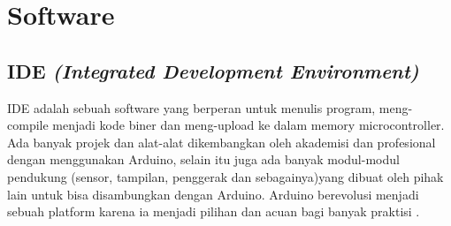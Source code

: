 \section{Software}
\subsection{IDE \textit{(Integrated Development Environment)}}
IDE adalah sebuah software yang berperan untuk menulis program, meng-compile menjadi kode biner dan meng-upload ke dalam memory microcontroller. Ada banyak projek dan alat-alat dikembangkan oleh akademisi dan profesional dengan menggunakan Arduino, selain itu juga ada banyak modul-modul pendukung (sensor, tampilan, penggerak dan sebagainya)yang dibuat oleh pihak lain untuk bisa disambungkan dengan Arduino. Arduino berevolusi menjadi sebuah platform karena ia menjadi pilihan dan acuan bagi banyak praktisi \cite{djuandi2011pengenalan}. 